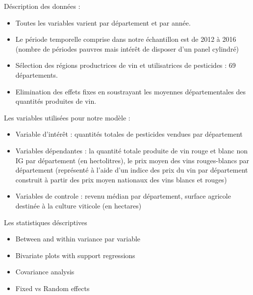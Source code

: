 \documentclass[11pt,ignorenonframetext,]{beamer}
\providecommand{\tightlist}{%
  \setlength{\itemsep}{0pt}\setlength{\parskip}{0pt}}
\begin{document}
\begin{frame}{Déscription des données :}
\protect\hypertarget{description-des-donnees}{}

\begin{itemize}
\tightlist
\item
  Toutes les variables varient par département et par année.
\item
  Le période temporelle comprise dans notre échantillon est de 2012 à
  2016 (nombre de périodes pauvres mais intérêt de disposer d'un panel
  cylindré)
\item
  Sélection des régions productrices de vin et utilisatrices de
  pesticides : 69 départements.
\item
  Elimination des effets fixes en soustrayant les moyennes
  départementales des quantités produites de vin.
\end{itemize}

\end{frame}

\begin{frame}{Les variables utilisées pour notre modèle :}
\protect\hypertarget{les-variables-utilisees-pour-notre-modele}{}

\begin{itemize}
\tightlist
\item
  Variable d'intérêt : quantités totales de pesticides vendues par
  département
\item
  Variables dépendantes : la quantité totale produite de vin rouge et
  blanc non IG par département (en hectolitres), le prix moyen des vins
  rouges-blancs par département (représenté à l'aide d'un indice des
  prix du vin par département construit à partir des prix moyen
  nationaux des vins blancs et rouges)
\item
  Variables de controle : revenu médian par département, surface
  agricole destinée à la culture viticole (en hectares)
\end{itemize}

\end{frame}

\begin{frame}{Les statistiques déscriptives}
\protect\hypertarget{les-statistiques-descriptives}{}

\begin{itemize}
\tightlist
\item
  Between and within variance par variable
\item
  Bivariate plots with support regressions
\item
  Covariance analysis
\item
  Fixed vs Random effects
\end{itemize}

\end{frame}
\end{document}
